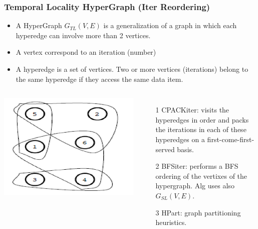 \documentclass{beamer}
\newcommand{\emp}[1]{\textcolor{DikuRed}{ #1}}
\begin{document}
\begin{frame}[fragile,t]
  \frametitle{Temporal Locality HyperGraph (Iter Reordering)}

\begin{itemize}
    \item A HyperGraph $G_{TL}(V,E)$ is a generalization of a graph in which
            each hyperedge can involve more than 2 vertices.
    \item A vertex correspond to an iteration (number)
    \item A hyperedge is a set of vertices. Two or more
            vertices (iterations) belong to the same hyperedge 
            if they access the same data item.
\end  {itemize}

\begin{columns}
\includegraphics[width=33ex]{ParTeaserFigs/TempLocHyper}
\begin{itemize}
\item[1] \emp{CPACKiter}: visits the hyperedges in order
            and packs the iterations in each of these hyperedges on a
            first-come-first-served basis.\smallskip

\item[2] \emp{BFSiter}: performs a BFS ordering of the vertixes
            of the hypergraph. Alg uses also $G_{SL}(V,E)$.\smallskip

\item[3] \emp{HPart}: graph partitioning heuristics.
\end{itemize}
\end{columns}

 
\end{frame}
\end{document}
